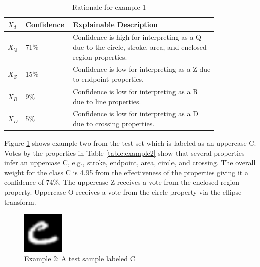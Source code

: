 \documentclass[conference]{IEEEtran}
\begin{document}
\begin{table}
    \caption{Rationale for example 1}
    \centering
    \begin{tabular}{| p{0.04\linewidth} | p{0.14\linewidth} | p{0.65\linewidth} |}
    \hline
     $X_d$ & Confidence & Explainable Description \\
    \hline \cline{1-3}
    $X_Q$ & 71\% & Confidence is high for interpreting as a Q due to the circle, stroke, area, and enclosed region properties. \\ 
    \hline
    $X_Z$ & 15\% & Confidence is low for interpreting as a Z due to endpoint properties. \\
    \hline
    $X_R$ & 9\% & Confidence is low for interpreting as a R due to line properties. \\
    \hline
    $X_D$ & 5\% & Confidence is low for interpreting as a D due to crossing properties. \\
    \hline
    \end{tabular}
    \label{table:exexample1}
\end{table}

Figure \ref{fig:ex2} shows example two from the test set which is labeled as an
uppercase C. Votes by the properties in Table \ref{table:example2} show that
several properties infer an uppercase C, e.g., stroke, endpoint, area, circle,
and crossing. The overall weight for the class C is 4.95 from the effectiveness
of the properties giving it a confidence of 74\%. The uppercase Z receives a
vote from the enclosed region property. Uppercase O receives a vote from the
circle property via the ellipse transform.

\begin{figure}
    \centering
    \includegraphics[width=2cm]{./images/examples/test-C-1.png}
    \caption{Example 2: A test sample labeled C}
    \label{fig:ex2}
\end{figure}
\end{document}

